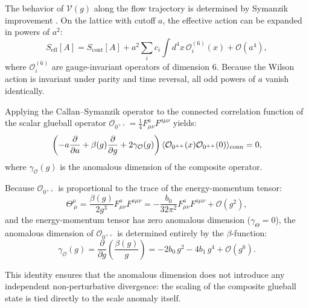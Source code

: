 The behavior of $\mathcal{V}(g)$ along the flow trajectory is determined by Symanzik improvement \cite{Symanzik1971}. On the lattice with cutoff $a$, the effective action can be expanded in powers of $a^2$:
\begin{equation}
S_{\mathrm{eff}}[A] = S_{\mathrm{cont}}[A] + a^2 \sum_i c_i \int d^4x \, \mathcal{O}_i^{(6)}(x) + \mathcal{O}(a^4),
\end{equation}
where $\mathcal{O}_i^{(6)}$ are gauge-invariant operators of dimension 6. Because the Wilson action is invariant under parity and time reversal, all odd powers of $a$ vanish identically.

Applying the Callan--Symanzik operator to the connected correlation function of the scalar glueball operator $\mathcal{O}_{0^{++}} = \frac{1}{4} F_{\mu\nu}^a F^{a\mu\nu}$ yields:
\begin{equation}
\label{eq:cs_composite_glueball}
\left( -a \frac{\partial}{\partial a} + \beta(g) \frac{\partial}{\partial g} + 2 \gamma_{\mathcal{O}}(g) \right) \langle \mathcal{O}_{0^{++}}(x) \mathcal{O}_{0^{++}}(0) \rangle_{\mathrm{conn}} = 0,
\end{equation}
where $\gamma_{\mathcal{O}}(g)$ is the anomalous dimension of the composite operator.

\begin{proposition}
\label{prop:anomalous_dimension_trace}
Because $\mathcal{O}_{0^{++}}$ is proportional to the trace of the energy-momentum tensor:
\begin{equation}
\Theta^\mu_{\ \mu} = \frac{\beta(g)}{2 g^3} F_{\mu\nu}^a F^{a\mu\nu} = -\frac{b_0}{32\pi^2} F_{\mu\nu}^a F^{a\mu\nu} + \mathcal{O}(g^2),
\end{equation}
and the energy-momentum tensor has zero anomalous dimension ($\gamma_\Theta = 0$), the anomalous dimension of $\mathcal{O}_{0^{++}}$ is determined entirely by the $\beta$-function:
\begin{equation}
\label{eq:gamma_trace_relation}
\gamma_{\mathcal{O}}(g) = \frac{\partial}{\partial g} \left( \frac{\beta(g)}{g} \right) = -2 b_0 \, g^2 - 4 b_1 \, g^4 + \mathcal{O}(g^6).
\end{equation}
\end{proposition}

This identity ensures that the anomalous dimension does not introduce any independent non-perturbative divergence: the scaling of the composite glueball state is tied directly to the scale anomaly itself.

